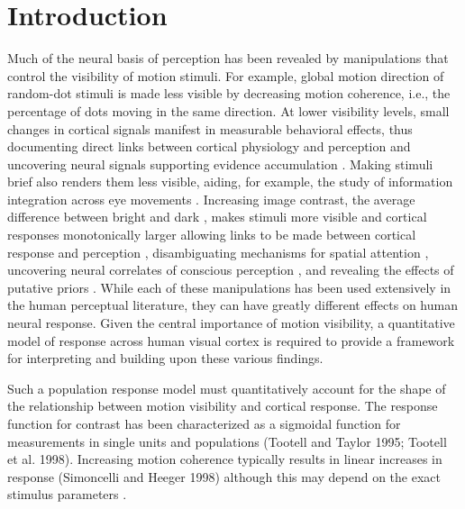 
\section{Introduction}

Much of the neural basis of perception has been revealed by manipulations that control the visibility of motion stimuli. For example, global motion direction of random-dot stimuli is made less visible by decreasing motion coherence, i.e., the percentage of dots moving in the same direction. At lower visibility levels, small changes in cortical signals manifest in measurable behavioral effects, thus documenting direct links between cortical physiology and perception \citep{Britten1992-xy,Newsome1989-fr} and uncovering neural signals supporting evidence accumulation \citep{Huk2005-xg,Katz2016-xc,Roitman2002-mw,Shadlen1996-pr,Shadlen2001-uu}. Making stimuli brief also renders them less visible, aiding, for example, the study of information integration across eye movements \citep{Melcher2003-vw}. Increasing image contrast, the average difference between bright and dark \citep{Bex2002-it}, makes stimuli more visible and cortical responses monotonically larger allowing links to be made between cortical response and perception \citep{Boynton1999-jd,Ress2000-pa,Ress2003-lt}, disambiguating mechanisms for spatial attention \citep{Carrasco2000-es,Hara2014-tm,Hara2014-mv,Pestilli2011-gi}, uncovering neural correlates of conscious perception \citep{Lumer1998-qs,Wunderlich2005-ff}, and revealing the effects of putative priors \citep{Stocker2006-rk,Vintch2014-zu}. While each of these manipulations has been used extensively in the human perceptual literature, they can have greatly different effects on human neural response. Given the central importance of motion visibility, a quantitative model of response across human visual cortex is required to provide a framework for interpreting and building upon these various findings.

Such a population response model must quantitatively account for the shape of the relationship between motion visibility and cortical response. The response function for contrast has been characterized as a sigmoidal function for measurements in single units \citep{Albrecht1982-rq,Sclar1990-lk} and populations \citep{Avidan2002-jg,Boynton1996-ff,Boynton1999-jd,Gardner2005-pg,Logothetis2001-kk,Olman2004-dd} (Tootell and Taylor 1995; Tootell et al. 1998). Increasing motion coherence typically results in linear increases in response \citep{Aspell2005-tc,Britten1993-oh,Handel2007-xk,Rees2000-ul} (Simoncelli and Heeger 1998) although this may depend on the exact stimulus parameters \citep{Ajina2015-xm}.

